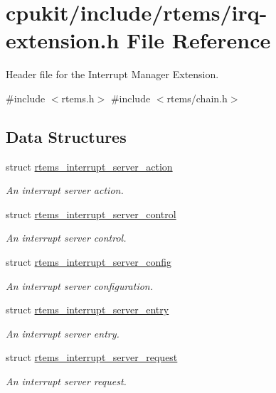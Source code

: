 \hypertarget{irq-extension_8h}{}\section{cpukit/include/rtems/irq-\/extension.h File Reference}
\label{irq-extension_8h}


Header file for the Interrupt Manager Extension.  


{\ttfamily \#include $<$rtems.\+h$>$}\newline
{\ttfamily \#include $<$rtems/chain.\+h$>$}\newline
\subsection*{Data Structures}
\begin{DoxyCompactItemize}
\item 
struct \mbox{\hyperlink{structrtems__interrupt__server__action}{rtems\+\_\+interrupt\+\_\+server\+\_\+action}}
\begin{DoxyCompactList}\small\item\em An interrupt server action. \end{DoxyCompactList}\item 
struct \mbox{\hyperlink{structrtems__interrupt__server__control}{rtems\+\_\+interrupt\+\_\+server\+\_\+control}}
\begin{DoxyCompactList}\small\item\em An interrupt server control. \end{DoxyCompactList}\item 
struct \mbox{\hyperlink{structrtems__interrupt__server__config}{rtems\+\_\+interrupt\+\_\+server\+\_\+config}}
\begin{DoxyCompactList}\small\item\em An interrupt server configuration. \end{DoxyCompactList}\item 
struct \mbox{\hyperlink{structrtems__interrupt__server__entry}{rtems\+\_\+interrupt\+\_\+server\+\_\+entry}}
\begin{DoxyCompactList}\small\item\em An interrupt server entry. \end{DoxyCompactList}\item 
struct \mbox{\hyperlink{structrtems__interrupt__server__request}{rtems\+\_\+interrupt\+\_\+server\+\_\+request}}
\begin{DoxyCompactList}\small\item\em An interrupt server request. \end{DoxyCompactList}\end{DoxyCompactItemize}
